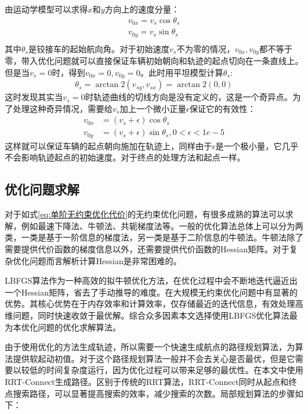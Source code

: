 \documentclass[master,academic]{ysuthesis} %
\begin{document}
		由运动学模型可以求得$x$和$y$方向上的速度分量：
		\begin{equation}
			\begin{aligned}
				v_{0x}=v_s\cos\theta _s\\
				v_{0y}=v_s\sin\theta _s\\
			\end{aligned}
		\end{equation}
		其中$\theta_s$是铰接车的起始航向角。对于初始速度$v_s$不为零的情况，$v_{0x},v_{0y}$都不等于零，带入优化问题就可以直接保证车辆初始朝向和轨迹的起点切向在一条直线上。但是当$v_{s}=0$时，得到$v_{0x}=0,v_{0y}=0$。此时用平坦模型计算$\theta_s$:
		\begin{equation}
			\theta_s=\arctan2 \left( v_{sy},v_{sx} \right) =\arctan2\left( 0,0 \right) 
		\end{equation}
		这时发现其实当$v_{s}=0$时轨迹曲线的切线方向是没有定义的，这是一个奇异点。为了处理这种奇异情况，需要给$v_{s}$加上一个微小正量$\epsilon$保证它的有效性：
		\begin{equation}
			\begin{aligned}
			v_{0x}&=\left( v_s+\epsilon \right) \cos\theta_s\\
			v_{0y}&=\left( v_s+\epsilon \right) \sin\theta_s,0<\epsilon <1e-5
			\end{aligned}
		\end{equation}
		这样就可以保证车辆的起点朝向施加在轨迹上，同样由于$\epsilon$是一个极小量，它几乎不会影响轨迹起点的初始速度。对于终点的处理方法和起点一样。

		\subsection{优化问题求解}
		对于如式\ref{eq:单阶无约束优化代价}的无约束优化问题，有很多成熟的算法可以求解，例如最速下降法、牛顿法、共轭梯度法等。一般的优化算法总体上可以分为两类，一类是基于一阶信息的梯度法，另一类是基于二阶信息的牛顿法。牛顿法除了需要提供代价函数的梯度信息以外，还需要提供代价函数的Hessian矩阵。对于复杂优化问题而言解析计算Hessian是非常困难的。
		
		LBFGS算法作为一种高效的拟牛顿优化方法，在优化过程中会不断地迭代逼近出一个Hessian矩阵，省去了手动推导的难度。在大规模无约束优化问题中有显著的优势。其核心优势在于内存效率和计算效率，仅存储最近的迭代信息，有效处理高维问题，同时快速收敛于最优解。综合众多因素本文选择使用LBFGS优化算法最为本优化问题的优化求解算法。

		由于使用优化的方法生成轨迹，所以需要一个快速生成航点的路径规划算法，为算法提供软起动初值。对于这个路径规划算法一般并不会去关心是否最优，但是它需要以较低的时间复杂度运行，因为优化过程可以带来足够的最优性。在本文中使用RRT-Connect生成路径。区别于传统的RRT算法，RRT-Connect同时从起点和终点搜索路径，可以显著提高搜索的效率，减少搜索的次数。局部规划算法的步骤如下：
\end{document}
